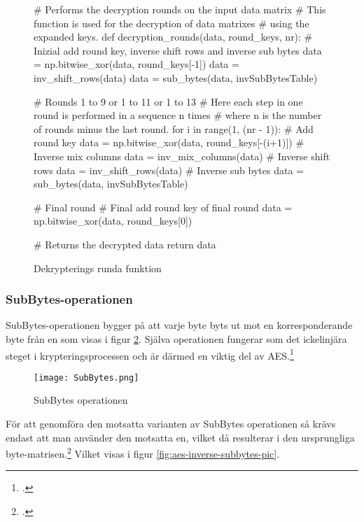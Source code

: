 \begin{figure}[H]
    \centering
    \begin{python}
    # Performs the decryption rounds on the input data matrix
    # This function is used for the decryption of data matrixes
    # using the expanded keys.
    def decryption_rounds(data, round_keys, nr):
        # Inizial add round key, inverse shift rows and inverse sub bytes
        data = np.bitwise_xor(data, round_keys[-1])
        data = inv_shift_rows(data)
        data = sub_bytes(data, invSubBytesTable)

        # Rounds 1 to 9 or 1 to 11 or 1 to 13
        # Here each step in one round is performed in a sequence n times
        # where n is the number of rounds minus the last round.
        for i in range(1, (nr - 1)):
            # Add round key
            data = np.bitwise_xor(data, round_keys[-(i+1)])
            # Inverse mix columns
            data = inv_mix_columns(data)
            # Inverse shift rows
            data = inv_shift_rows(data)
            # Inverse sub bytes
            data = sub_bytes(data, invSubBytesTable)

        # Final round
        # Final add round key of final round
        data = np.bitwise_xor(data, round_keys[0])

        # Returns the decrypted data
        return data

    \end{python}
    \caption{Dekrypterings runda funktion}
    \label{fig:decryption-rounds-function}
\end{figure}

\subsubsection{SubBytes-operationen} %
\label{sec:aes-subbytes}
SubBytes-operationen bygger på att varje \gls{byte} byts ut mot en korresponderande \gls{byte} från en  som
visas i figur \ref{fig:aes-subbytes-pic}.
Själva operationen fungerar som det ickelinjära steget i krypteringsprocessen och är därmed en viktig del av AES.\footcite{daemen1999aes}

\begin{figure}[H]
    \centering
    \texttt{[image: SubBytes.png]}
    \caption{SubBytes operationen}
    \label{fig:aes-subbytes-pic}
\end{figure}

För att genomföra den motsatta varianten av SubBytes operationen så krävs endast att man använder den motsatta en,
vilket då resulterar i den ursprungliga \gls{byte}-matrisen.\footcite{daemen1999aes} Vilket visas i figur \ref{fig:aes-inverse-subbytes-pic}.

